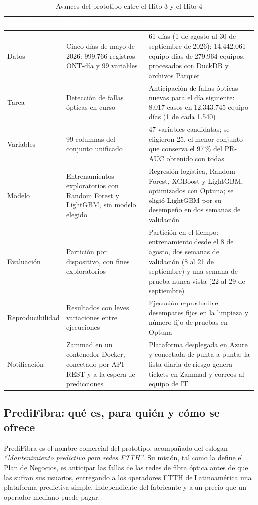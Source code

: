 \documentclass[12pt,a4paper]{article}
\begin{document}
\begin{table}[!htb]
\centering
\caption{Avances del prototipo entre el Hito 3 y el Hito 4}
\label{tab:h3_h4}
\small
\renewcommand{\arraystretch}{1.3}
\begin{tabularx}{\textwidth}{|Q{2.9cm}|Z|Z|}
\hline
{}
\textcolor{white}{\textbf{Aspecto}} & \textcolor{white}{\textbf{Hito 3}} & \textcolor{white}{\textbf{Hito 4}} \\ \hline
Datos & Cinco días de mayo de 2026: 999.766 registros ONT-día y 99 variables & 61 días (1 de agosto al 30 de septiembre de 2026): 14.442.061 equipo-días de 279.964 equipos, procesados con DuckDB y archivos Parquet \\ \hline
Tarea & Detección de fallas ópticas en curso & Anticipación de fallas ópticas nuevas para el día siguiente: 8.017 casos en 12.343.745 equipo-días (1 de cada 1.540) \\ \hline
Variables & 99 columnas del conjunto unificado & 47 variables candidatas; se eligieron 25, el menor conjunto que conserva el 97\,\% del PR-AUC obtenido con todas \\ \hline
Modelo & Entrenamientos exploratorios con Random Forest y LightGBM, sin modelo elegido & Regresión logística, Random Forest, XGBoost y LightGBM, optimizados con Optuna; se eligió LightGBM por su desempeño en dos semanas de validación \\ \hline
Evaluación & Partición por dispositivo, con fines exploratorios & Partición en el tiempo: entrenamiento desde el 8 de agosto, dos semanas de validación (8 al 21 de septiembre) y una semana de prueba nunca vista (22 al 29 de septiembre) \\ \hline
Reproducibilidad & Resultados con leves variaciones entre ejecuciones & Ejecución reproducible: desempates fijos en la limpieza y número fijo de pruebas en Optuna \\ \hline
Notificación & Zammad en un contenedor Docker, conectado por API REST y a la espera de predicciones & Plataforma desplegada en Azure y conectada de punta a punta: la lista diaria de riesgo genera tickets en Zammad y correos al equipo de IT \\ \hline
\end{tabularx}
\end{table}

\subsection{PrediFibra: qué es, para quién y cómo se ofrece}
\label{subsec:oferta}
\noindent
PrediFibra es el nombre comercial del prototipo, acompañado del eslogan \textit{``Mantenimiento predictivo para redes FTTH''}. Su misión, tal como la define el Plan de Negocios, es anticipar las fallas de las redes de fibra óptica antes de que las sufran sus usuarios, entregando a los operadores FTTH de Latinoamérica una plataforma predictiva simple, independiente del fabricante y a un precio que un operador mediano puede pagar.\\\\
\end{document}
